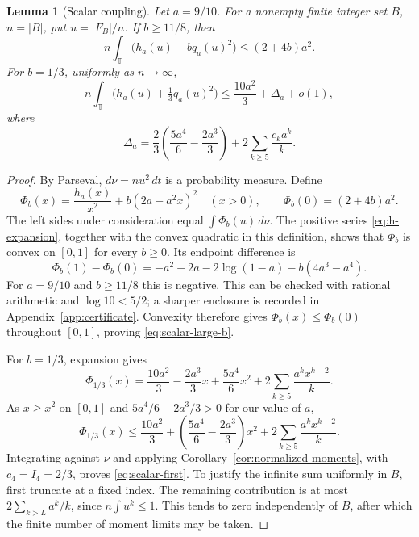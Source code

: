 \documentclass[11pt,reqno]{amsart}
\numberwithin{equation}{section}
\newtheorem{lemma}[theorem]{Lemma}
\theoremstyle{definition}
\theoremstyle{remark}
\newcommand{\T}{\mathbb T}
\begin{document}
\begin{lemma}[Scalar coupling]\label{lem:scalar}
Let $a=9/10$. For a nonempty finite integer set $B$, $n=|B|$, put
$u=|F_B|/n$. If $b\ge11/8$, then
\begin{equation}\label{eq:scalar-large-b}
 n\int_\T\bigl(h_a(u)+bq_a(u)^2\bigr)\le(2+4b)a^2.
\end{equation}
For $b=1/3$, uniformly as $n\to\infty$,
\begin{equation}\label{eq:scalar-first}
 n\int_\T\bigl(h_a(u)+\tfrac13q_a(u)^2\bigr)
 \le\frac{10a^2}{3}+\Delta_a+o(1),
\end{equation}
where
\begin{equation}\label{eq:Delta}
 \Delta_a=\frac23\left(\frac{5a^4}{6}-\frac{2a^3}{3}\right)
                 +2\sum_{k\ge5}\frac{c_ka^k}{k}.
\end{equation}
\end{lemma}
\begin{proof}
By Parseval, $d\nu=nu^2\,dt$ is a probability measure. Define
\[
 \Phi_b(x)=\frac{h_a(x)}{x^2}+b(2a-a^2x)^2\quad(x>0),\qquad
 \Phi_b(0)=(2+4b)a^2.
\]
The left sides under consideration equal $\int\Phi_b(u)\,d\nu$.
The positive series \eqref{eq:h-expansion}, together with the convex
quadratic in this definition, shows that $\Phi_b$ is convex on $[0,1]$
for every $b\ge0$. Its endpoint difference is
\begin{equation}\label{eq:Phi-endpoints}
 \Phi_b(1)-\Phi_b(0)
 =-a^2-2a-2\log(1-a)-b(4a^3-a^4).
\end{equation}
For $a=9/10$ and $b\ge11/8$ this is negative. This can be checked with
rational arithmetic and $\log10<5/2$; a sharper enclosure is recorded in
Appendix~\ref{app:certificate}. Convexity therefore gives
$\Phi_b(x)\le\Phi_b(0)$ throughout $[0,1]$, proving
\eqref{eq:scalar-large-b}.

For $b=1/3$, expansion gives
\[
 \Phi_{1/3}(x)=\frac{10a^2}{3}-\frac{2a^3}{3}x
       +\frac{5a^4}{6}x^2
       +2\sum_{k\ge5}\frac{a^kx^{k-2}}{k}.
\]
As $x\ge x^2$ on $[0,1]$ and
$5a^4/6-2a^3/3>0$ for our value of $a$,
\[
 \Phi_{1/3}(x)\le\frac{10a^2}{3}
 +\left(\frac{5a^4}{6}-\frac{2a^3}{3}\right)x^2
 +2\sum_{k\ge5}\frac{a^kx^{k-2}}{k}.
\]
Integrating against $\nu$ and applying
Corollary~\ref{cor:normalized-moments}, with $c_4=I_4=2/3$, proves
\eqref{eq:scalar-first}. To justify the infinite sum uniformly in $B$,
first truncate at a fixed index. The remaining contribution is at most
$2\sum_{k>L}a^k/k$, since $n\int u^k\le1$. This tends to zero independently
of $B$, after which the finite number of moment limits may be taken.
\end{proof}
\end{document}
